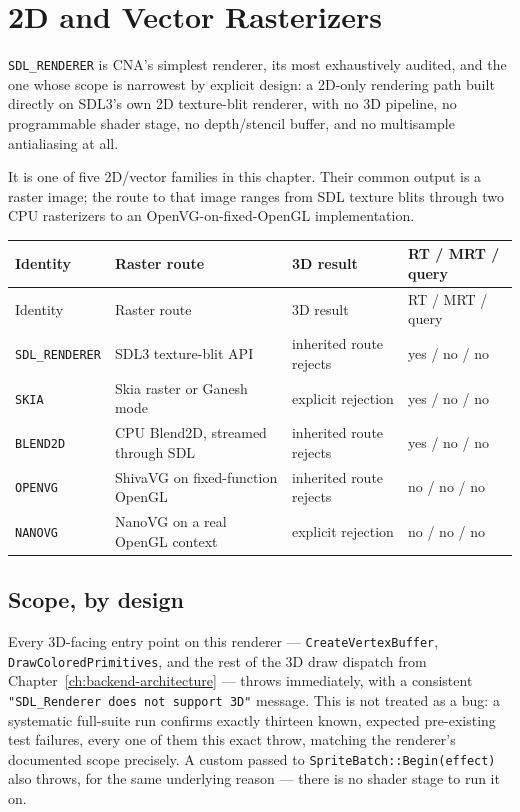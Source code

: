 \chapter{2D and Vector Rasterizers}
\label{ch:vector-rasterizers}
\label{ch:sdl-renderer}

\texttt{SDL\_RENDERER} is CNA's simplest renderer, its most exhaustively audited, and the one
whose scope is narrowest by explicit design: a 2D-only rendering path built directly on
SDL3's own 2D texture-blit renderer, with no 3D pipeline, no programmable shader stage, no
depth/stencil buffer, and no multisample antialiasing at all.

It is one of five 2D/vector families in this chapter. Their common output is a raster image;
the route to that image ranges from SDL texture blits through two CPU rasterizers to an
OpenVG-on-fixed-OpenGL implementation.

\begin{longtable}{p{}p{}p{}p{}}
\toprule
Identity & Raster route & 3D result & RT / MRT / query \\
\midrule
\endfirsthead
\toprule
Identity & Raster route & 3D result & RT / MRT / query \\
\midrule
\endhead
\texttt{SDL\_RENDERER} & SDL3 texture-blit API & inherited route rejects & yes / no / no \\
\texttt{SKIA} & Skia raster or Ganesh mode & explicit rejection & yes / no / no \\
\texttt{BLEND2D} & CPU Blend2D, streamed through SDL & inherited route rejects & yes / no / no \\
\texttt{OPENVG} & ShivaVG on fixed-function OpenGL & inherited route rejects & no / no / no \\
\texttt{NANOVG} & NanoVG on a real OpenGL context & explicit rejection & no / no / no \\
\bottomrule
\end{longtable}

\section{Scope, by design}

Every 3D-facing entry point on this renderer --- \texttt{CreateVertexBuffer},
\texttt{DrawColoredPrimitives}, and the rest of the 3D draw dispatch from
Chapter~\ref{ch:backend-architecture} --- throws immediately, with a consistent
\texttt{"SDL\_Renderer does not support 3D"} message. This is not treated as a bug: a
systematic full-suite run confirms exactly thirteen known, expected pre-existing test
failures, every one of them this exact throw, matching the renderer's documented scope
precisely. A custom  passed to \texttt{SpriteBatch::Begin(effect)} also
throws, for the same underlying reason --- there is no shader stage to run it on.

